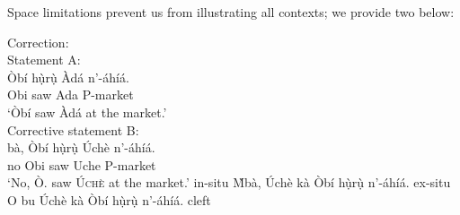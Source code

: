\documentclass[output=paper,colorlinks,citecolor=brown]{langscibook}
\begin{document}
Space limitations prevent us from illustrating all contexts; we provide two below:\largerpage[1.5]


\ea%
    \label{ex:amaechi:9}
    Correction:\\
    \ea\label{ex:amaechi:9a}
    Statement A:\\
    \gll    Òbí hụ̀rụ̀ Àdá n'-áhíá.\\
            Obi saw Ada P-market\\
    \glt    `Òbí saw {Àdá} at the market.'\\
    \ex\label{ex:amaechi:9b}
    Corrective statement B:\\
        \ea\label{ex:amaechi:9bi}
        bà, Òbí hụ̀rụ̀ Úchè n'-áhíá.\\
                no Obi saw Uche P-market\\
        \glt    `No, Ò. saw \textsc{Úchè} at the market.'  \hfill{in-situ}
        \ex\label{ex:amaechi:9bii}
                {\`M}bà, Úchè kà Òbí hụ̀rụ̀   n'-áhíá.  \hfill{ex-situ}
        \ex\label{ex:amaechi:9biii}
                O bu Úchè kà Òbí hụ̀rụ̀   n'-áhíá. \hfill{cleft}
        \z
    \z
\z
\end{document}
